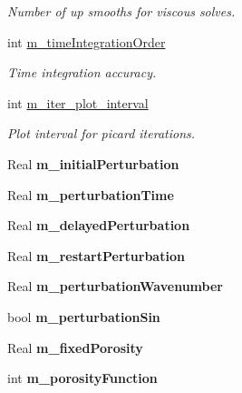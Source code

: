 \begin{DoxyCompactItemize}
\begin{DoxyCompactList}\small\item\em Number of up smooths for viscous solves. \end{DoxyCompactList}\item 
int \hyperlink{class_a_m_r_level_mushy_layer_a760063c20ec9abb7820afc11cafad1ab}{m\-\_\-time\-Integration\-Order}
\begin{DoxyCompactList}\small\item\em Time integration accuracy. \end{DoxyCompactList}\item 
int \hyperlink{class_a_m_r_level_mushy_layer_a1b88cc852494c1537cd7e5fbc01bae53}{m\-\_\-iter\-\_\-plot\-\_\-interval}
\begin{DoxyCompactList}\small\item\em Plot interval for picard iterations. \end{DoxyCompactList}\item 
\hypertarget{class_a_m_r_level_mushy_layer_af39200bb363589378b4561cd9054b686}{Real {\bfseries m\-\_\-initial\-Perturbation}}\label{class_a_m_r_level_mushy_layer_af39200bb363589378b4561cd9054b686}

\item 
\hypertarget{class_a_m_r_level_mushy_layer_ad5de6949a3948b1adcb35344a6e34605}{Real {\bfseries m\-\_\-perturbation\-Time}}\label{class_a_m_r_level_mushy_layer_ad5de6949a3948b1adcb35344a6e34605}

\item 
\hypertarget{class_a_m_r_level_mushy_layer_a4c04f83744b285463b7e995e981f5106}{Real {\bfseries m\-\_\-delayed\-Perturbation}}\label{class_a_m_r_level_mushy_layer_a4c04f83744b285463b7e995e981f5106}

\item 
\hypertarget{class_a_m_r_level_mushy_layer_a842163e81fb5627656b0fef429302a9c}{Real {\bfseries m\-\_\-restart\-Perturbation}}\label{class_a_m_r_level_mushy_layer_a842163e81fb5627656b0fef429302a9c}

\item 
\hypertarget{class_a_m_r_level_mushy_layer_a6efe658340f6ed8e298d006c22a70d6e}{Real {\bfseries m\-\_\-perturbation\-Wavenumber}}\label{class_a_m_r_level_mushy_layer_a6efe658340f6ed8e298d006c22a70d6e}

\item 
\hypertarget{class_a_m_r_level_mushy_layer_a95dddef4de24d7af747d1ebb06b37936}{bool {\bfseries m\-\_\-perturbation\-Sin}}\label{class_a_m_r_level_mushy_layer_a95dddef4de24d7af747d1ebb06b37936}

\item 
\hypertarget{class_a_m_r_level_mushy_layer_af6c899586a7e51b2f7f88836354e6c58}{Real {\bfseries m\-\_\-fixed\-Porosity}}\label{class_a_m_r_level_mushy_layer_af6c899586a7e51b2f7f88836354e6c58}

\item 
\hypertarget{class_a_m_r_level_mushy_layer_a10f499d1859bd0d1a1e910ea35125e32}{int {\bfseries m\-\_\-porosity\-Function}}\label{class_a_m_r_level_mushy_layer_a10f499d1859bd0d1a1e910ea35125e32}

\end{DoxyCompactItemize}
